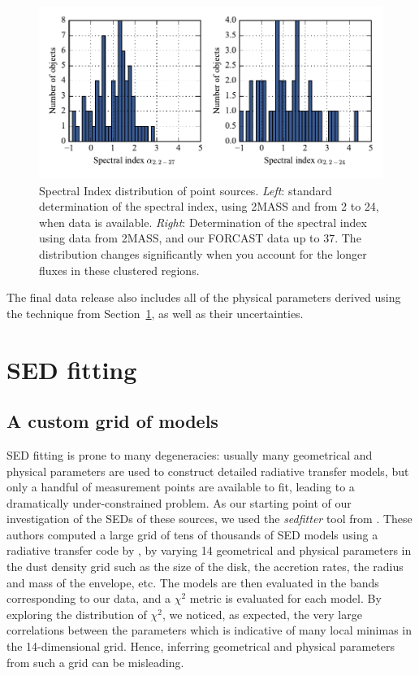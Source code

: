 \begin{figure}[!h]
\begin{center}
\includegraphics[width=\textwidth]{Figures/SpectralIndex.pdf}
\vspace{-1cm}
\caption[Spectral Index distribution of point sources]{Spectral Index distribution of point sources. \textit{Left}: standard determination of the spectral index, using 2MASS and \Spitzer from \SI{2}{\micron} to \SI{24}{\micron}, when data is available. \textit{Right}: Determination of the spectral index using data from 2MASS, \Spitzer and our FORCAST data up to \SI{37}{\micron}. The distribution changes significantly when you account for the longer fluxes in these clustered regions.}
\label{fig:SpectralIndex}
\end{center}
\end{figure}

The final data release also includes all of the physical parameters derived using the technique from Section~\ref{sec:SEDFitting}, as well as their uncertainties.
																							
\section{SED fitting}
\label{sec:SEDFitting}
\subsection{A custom grid of models}

SED fitting is prone to many degeneracies: usually many geometrical and physical parameters are used to construct detailed radiative transfer models, but only a handful of measurement points are available to fit, leading to a dramatically under-constrained problem. As our starting point of our investigation of the SEDs of these sources, we used the \textit{sedfitter} tool from \citep{Robitaille:2006cb}. These authors computed a large grid of tens of thousands of SED models using a radiative transfer code by \citep{Whitney:2003ke}, by varying 14 geometrical and physical parameters in the dust density grid such as the size of the disk, the accretion rates, the radius and mass of the envelope, etc. The models are then evaluated in the bands corresponding to our data, and a $\chi^2$ metric is evaluated for each model. By exploring the distribution of $\chi^2$, we noticed, as expected, the very large correlations between the parameters which is indicative of many local minimas in the 14-dimensional grid. Hence, inferring geometrical and physical parameters from such a grid can be misleading.


